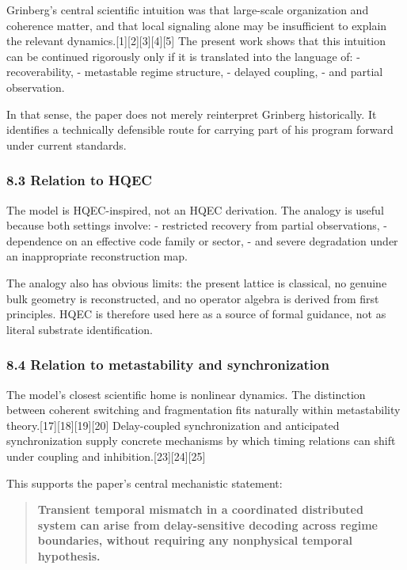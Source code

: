 \documentclass[
]{article}
\begin{document}
Grinberg's central scientific intuition was that large-scale
organization and coherence matter, and that local signaling alone may be
insufficient to explain the relevant
dynamics.{[}1{]}{[}2{]}{[}3{]}{[}4{]}{[}5{]} The present work shows that
this intuition can be continued rigorously only if it is translated into
the language of: - recoverability, - metastable regime structure, -
delayed coupling, - and partial observation.

In that sense, the paper does not merely reinterpret Grinberg
historically. It identifies a technically defensible route for carrying
part of his program forward under current standards.

\subsubsection{8.3 Relation to HQEC}\label{relation-to-hqec}

The model is HQEC-inspired, not an HQEC derivation. The analogy is
useful because both settings involve: - restricted recovery from partial
observations, - dependence on an effective code family or sector, - and
severe degradation under an inappropriate reconstruction map.

The analogy also has obvious limits: the present lattice is classical,
no genuine bulk geometry is reconstructed, and no operator algebra is
derived from first principles. HQEC is therefore used here as a source
of formal guidance, not as literal substrate identification.

\subsubsection{8.4 Relation to metastability and
synchronization}\label{relation-to-metastability-and-synchronization}

The model's closest scientific home is nonlinear dynamics. The
distinction between coherent switching and fragmentation fits naturally
within metastability theory.{[}17{]}{[}18{]}{[}19{]}{[}20{]}
Delay-coupled synchronization and anticipated synchronization supply
concrete mechanisms by which timing relations can shift under coupling
and inhibition.{[}23{]}{[}24{]}{[}25{]}

This supports the paper's central mechanistic statement:

\begin{quote}
\textbf{Transient temporal mismatch in a coordinated distributed system
can arise from delay-sensitive decoding across regime boundaries,
without requiring any nonphysical temporal hypothesis.}
\end{quote}
\end{document}
